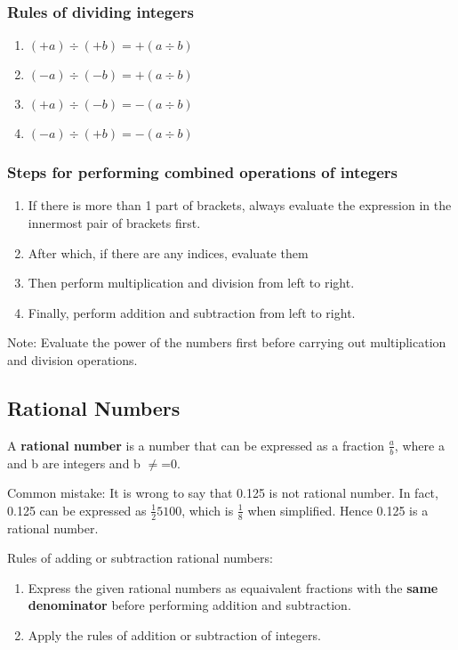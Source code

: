 \documentclass[../main]{subfiles}
\begin{document}
\subsubsection{Rules of dividing integers}
\begin{enumerate}
\item \((+a) \div (+b) = + ( a \div b)\)
\item \((-a) \div (-b) = +(a \div b)\)
\item \((+a) \div (-b) = - (a \div b)\)
\item \((-a) \div (+b) = -(a \div b)\)
\end{enumerate}

\subsubsection{Steps for performing combined operations of integers}
\begin{enumerate}
\item If there is more than 1 part of brackets, always evaluate the expression
  in the innermost pair of brackets first.
\item After which, if there are any indices, evaluate them
\item Then perform multiplication and division from left to right.
\item Finally, perform addition and subtraction from left to right.
\end{enumerate}

Note: Evaluate the power of the numbers first before carrying out multiplication
and division operations.

\subsection{Rational Numbers}

A \textbf{rational number} is a number that can be expressed as a fraction
\(\frac a b\), where a and b are integers and b \(\neq\)=0.

Common mistake:
It is wrong to say that 0.125 is not rational number. In fact, 0.125 can be
expressed as \(\frac 125 100\), which is \(\frac 1 8\) when simplified. Hence
0.125 is a rational number.

Rules of adding or subtraction rational numbers:
\begin{enumerate}
\item Express the given rational numbers as equaivalent fractions with the
  \textbf{same denominator} before performing addition and subtraction.
\item Apply the rules of addition or subtraction of integers.
\end{enumerate}
\end{document}

